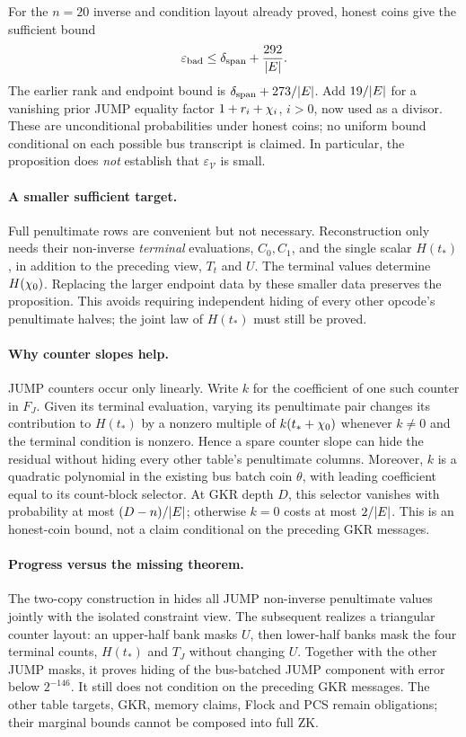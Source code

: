 \documentclass[11pt]{article}
\begin{document}
For the $n=20$ inverse and condition layout already proved, honest coins give the sufficient bound
\[
 \varepsilon_{\mathrm{bad}}
 \le \delta_{\mathrm{span}}+\frac{292}{|E|}.
\]
The earlier rank and endpoint bound is $\delta_{\mathrm{span}}+273/|E|$. Add $19/|E|$ for a vanishing prior JUMP equality factor $1+r_i+\chi_i$, $i>0$, now used as a divisor. These are unconditional probabilities under honest coins; no uniform bound conditional on each possible bus transcript is claimed. In particular, the proposition does \emph{not} establish that $\varepsilon_{\mathcal V}$ is small.

\paragraph{A smaller sufficient target.} Full penultimate rows are convenient but not necessary. Reconstruction only needs their non-inverse \emph{terminal} evaluations, $C_0,C_1$, and the single scalar $H(t_*)$, in addition to the preceding view, $T_t$ and $U$. The terminal values determine $H(\chi_0)$. Replacing the larger endpoint data by these smaller data preserves the proposition. This avoids requiring independent hiding of every other opcode's penultimate halves; the joint law of $H(t_*)$ must still be proved.

\paragraph{Why counter slopes help.} JUMP counters occur only linearly. Write $k$ for the coefficient of one such counter in $F_J$. Given its terminal evaluation, varying its penultimate pair changes its contribution to $H(t_*)$ by a nonzero multiple of $k(t_*+\chi_0)$ whenever $k\ne0$ and the terminal condition is nonzero. Hence a spare counter slope can hide the residual without hiding every other table's penultimate columns. Moreover, $k$ is a quadratic polynomial in the existing bus batch coin $\theta$, with leading coefficient equal to its count-block selector. At GKR depth $D$, this selector vanishes with probability at most $(D-n)/|E|$; otherwise $k=0$ costs at most $2/|E|$. This is an honest-coin bound, not a claim conditional on the preceding GKR messages.

\paragraph{Progress versus the missing theorem.} The two-copy construction in  hides all JUMP non-inverse penultimate values jointly with the isolated constraint view. The subsequent  realizes a triangular counter layout: an upper-half bank masks $U$, then lower-half banks mask the four terminal counts, $H(t_*)$ and $T_J$ without changing $U$. Together with the other JUMP masks, it proves hiding of the bus-batched JUMP component with error below $2^{-146}$. It still does not condition on the preceding GKR messages. The other table targets, GKR, memory claims, Flock and PCS remain obligations; their marginal bounds cannot be composed into full ZK.
\end{document}

